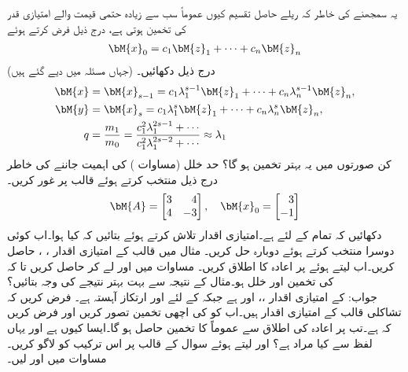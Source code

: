 \quad
یہ سمجھنے کی خاطر کہ ریلے حاصل تقسیم  کیوں عموماً  سب سے زیادہ حتمی قیمت والے امتیازی قدر  کی تخمین  ہوتی ہے، درج ذیل فرض کرتے ہوئے
\begin{align*}
\bM{x}_0=c_1\bM{z}_1+\cdots+c_n\bM{z}_n
\end{align*}
(جہاں   مسئلہ  میں دیے گئے ہیں) درج ذیل دکھائیں۔
\begin{align*}
\bM{x}&=\bM{x}_{s-1}=c_1\lambda_1^{s-1}\bM{z}_1+\cdots+c_n\lambda_n^{s-1}\bM{z}_n,\\
\bM{y}&=\bM{x}_s=c_1\lambda_1^s\bM{z}_1+\cdots+c_n\lambda_n^s\bM{z}_n,\\
q&=\frac{m_1}{m_0}=\frac{c_1^2\lambda_1^{2s-1}+\cdots}{c_1^2\lambda_1^{2s-2}+\cdots}\approx \lambda_1
\end{align*}
کن صورتوں میں یہ بہتر تخمین ہو گا؟
\quad
حد خلل (مساوات ) کی اہمیت جاننے کی خاطر درج ذیل  منتخب کرتے ہوئے قالب  پر غور کریں۔ 
\begin{align*}
\bM{A}=\begin{bmatrix*}[r]3&4\\4&-3  \end{bmatrix*}, \quad \bM{x}_0=\begin{bmatrix*}[r] 3\\-1  \end{bmatrix*}
\end{align*}
دکھائیں کہ تمام  کے لئے  ہے۔امتیازی اقدار تلاش کرتے ہوئے بتائیں کہ کیا ہوا۔اب کوئی دوسرا  منتخب کرتے ہوئے دوبارہ حل کریں۔
\quad
مثال  میں قالب  کے امتیازی اقدار ، ،  حاصل کریں۔اب  لیتے ہوئے   پر اعادہ کا اطلاق کریں۔ مساوات  میں  اور  لے کر  حاصل کریں تا کہ  کی تخمین  اور خلل  ہو۔مثال  کے نتیجہ سے بہت بہتر نتیجے کی وجہ بتائیں؟ \\
جواب:\quad
{} کے امتیازی اقدار ،،  اور  ہے جبکہ  کے لئے  اور ارتکاز آہستہ ہے۔ 
\quad
فرض کریں کہ تشاکلی قالب  کے امتیازی اقدار  ہیں۔اب  کو  کی اچھی تخمین تصور کریں   اور فرض کریں کہ  ہے۔تب  پر اعادہ کی اطلاق سے عموماً  کا تخمین حاصل ہو گا۔ایسا کیوں ہے اور یہاں لفظ  سے   کیا مراد ہے؟  اور  لیتے ہوئے سوال  کے قالب  پر اس ترکیب کو لاگو کریں۔ مساوات  میں  اور  لیں۔
